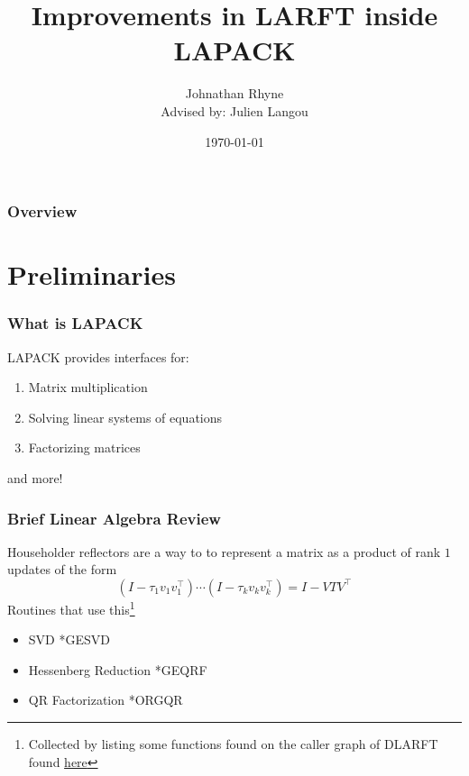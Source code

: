 \documentclass[12pt]{beamer}
\title{Improvements in LARFT inside LAPACK}
\author{Johnathan Rhyne\\Advised by: Julien Langou}
\institute{University of Colorado Denver}
\date{\today}
\begin{document}
    \begin{frame}
        \titlepage
    \end{frame}
    \begin{frame}
        \frametitle{Overview}
        \tableofcontents
    \end{frame}
    \section{Preliminaries}
    \begin{frame}
        \frametitle{What is LAPACK}
        LAPACK provides interfaces for:
        \begin{enumerate}
            \item Matrix multiplication
            \item Solving linear systems of equations
            \item Factorizing matrices
        \end{enumerate}
        and more!
    \end{frame}
    \begin{frame}
        \frametitle{Brief Linear Algebra Review}
        Householder reflectors are a way to to represent a matrix as a product of rank $1$ updates of the form
        $$
            \left(I - \tau_1 v_1v_1^\top\right)\cdots\left(I - \tau_k v_kv_k^\top\right) = I - VTV^\top
        $$
        Routines that use this\footnote{Collected by listing some functions found on the caller graph of DLARFT found \textcolor{blue}{\href{https://netlib.org/lapack/explore-html//d7/d0d/group__larft_ga20e5a4f351b3ca7d30078547e55884f5_ga20e5a4f351b3ca7d30078547e55884f5_icgraph_org.svg}{here}}}
        \begin{itemize}
            \item SVD *GESVD
            \item Hessenberg Reduction *GEQRF
            \item QR Factorization *ORGQR
        \end{itemize}
    \end{frame}
\end{document}
